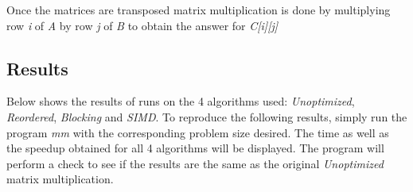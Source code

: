\documentclass{article}
\begin{document}
Once the matrices are transposed matrix multiplication is done by multiplying row \textit{i} of \textit{A} by row \textit{j} of \textit{B} to obtain the answer for \textit{C[i][j]}

\subsection{Results}

Below shows the results of runs on the 4 algorithms used: \textit{Unoptimized}, \textit{Reordered}, \textit{Blocking} and \textit{SIMD}. To reproduce the following results, simply run the program \textit{mm} with the 
corresponding problem size desired. The time as well as the speedup obtained for all 4 algorithms will be displayed. The program will perform a check to see if the results are the same as the original \textit{Unoptimized} matrix multiplication.
\end{document}
